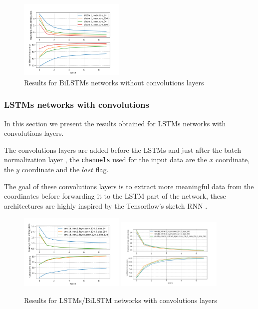 \documentclass[10pt,twocolumn,letterpaper]{article}
\begin{document}
\begin{figure}[h] 
\centering
\includegraphics[width=0.45\textwidth]{images/simple_bilstm_results.png}
\caption{Results for BiLSTMs networks without convolutions layers}
\label{fig:bilstm_results}
\end{figure}


\subsubsection{LSTMs networks with convolutions}

In this section we present the results obtained for LSTMs networks with convolutions layers.

The convolutions layers are added before the LSTMs and just after the batch normalization layer \cite{ioffe2015batch}, the \texttt{channels} used for the input data are the $x$ coordinate, the $y$ coordinate and the $last$ flag.

The goal of these convolutions layers is to extract more meaningful data from the coordinates before forwarding it to the LSTM part of the network, these architectures are highly inspired by the Tensorflow's sketch RNN \cite{TensorflowTutorial}.

\begin{figure}[h] 
\centering
\includegraphics[width=0.45\textwidth]{images/conv_lstm_results.png}
\includegraphics[width=0.45\textwidth]{images/conv_bilstm_results.png}
\caption{Results for LSTMs/BiLSTM networks with convolutions layers}
\label{fig:conv_lstm_results}
\end{figure}
\end{document}
